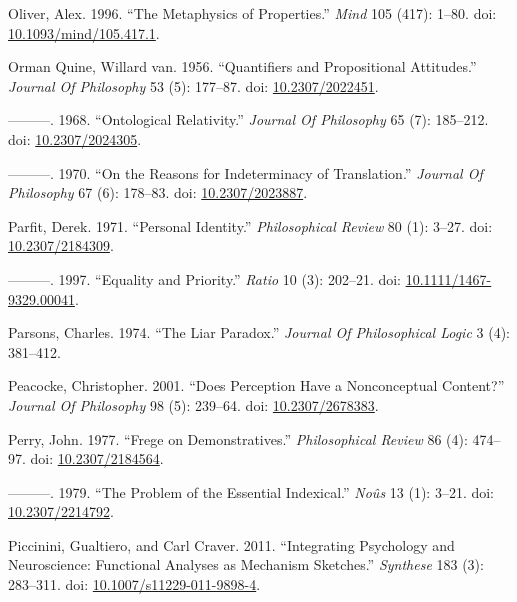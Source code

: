 \documentclass[
  10pt,
  letterpaper,
  DIV=11,
  numbers=noendperiod,
  twoside]{scrartcl}
\newlength{\cslhangindent}
\newenvironment{CSLReferences}[2] %
 {\begin{list}{}{%
  \setlength{\itemindent}{0pt}
  \setlength{\leftmargin}{0pt}
  \setlength{\parsep}{0pt}
  \ifodd #1
   \setlength{\leftmargin}{\cslhangindent}
   \setlength{\itemindent}{-1\cslhangindent}
  \fi
  \setlength{\itemsep}{#2\baselineskip}}}
 {\end{list}}
\begin{document}
\begin{CSLReferences}{1}{0}
Oliver, Alex. 1996. {``The Metaphysics of Properties.''} \emph{Mind} 105
(417): 1--80. doi:
\href{https://doi.org/10.1093/mind/105.417.1}{10.1093/mind/105.417.1}.

Orman Quine, Willard van. 1956. {``Quantifiers and Propositional
Attitudes.''} \emph{Journal Of Philosophy} 53 (5): 177--87. doi:
\href{https://doi.org/10.2307/2022451}{10.2307/2022451}.

---------. 1968. {``Ontological Relativity.''} \emph{Journal Of
Philosophy} 65 (7): 185--212. doi:
\href{https://doi.org/10.2307/2024305}{10.2307/2024305}.

---------. 1970. {``On the Reasons for Indeterminacy of Translation.''}
\emph{Journal Of Philosophy} 67 (6): 178--83. doi:
\href{https://doi.org/10.2307/2023887}{10.2307/2023887}.

Parfit, Derek. 1971. {``Personal Identity.''} \emph{Philosophical
Review} 80 (1): 3--27. doi:
\href{https://doi.org/10.2307/2184309}{10.2307/2184309}.

---------. 1997. {``Equality and Priority.''} \emph{Ratio} 10 (3):
202--21. doi:
\href{https://doi.org/10.1111/1467-9329.00041}{10.1111/1467-9329.00041}.

Parsons, Charles. 1974. {``The Liar Paradox.''} \emph{Journal Of
Philosophical Logic} 3 (4): 381--412.

Peacocke, Christopher. 2001. {``Does Perception Have a Nonconceptual
Content?''} \emph{Journal Of Philosophy} 98 (5): 239--64. doi:
\href{https://doi.org/10.2307/2678383}{10.2307/2678383}.

Perry, John. 1977. {``Frege on Demonstratives.''} \emph{Philosophical
Review} 86 (4): 474--97. doi:
\href{https://doi.org/10.2307/2184564}{10.2307/2184564}.

---------. 1979. {``The Problem of the Essential Indexical.''}
\emph{Noûs} 13 (1): 3--21. doi:
\href{https://doi.org/10.2307/2214792}{10.2307/2214792}.

Piccinini, Gualtiero, and Carl Craver. 2011. {``Integrating Psychology
and Neuroscience: Functional Analyses as Mechanism Sketches.''}
\emph{Synthese} 183 (3): 283--311. doi:
\href{https://doi.org/10.1007/s11229-011-9898-4}{10.1007/s11229-011-9898-4}.


\end{CSLReferences}
\end{document}
